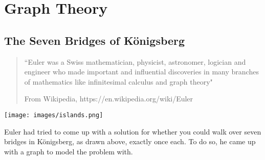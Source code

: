 \documentclass[a4paper,12pt]{book}
\title{}
\author{Rachel Morris}
\date{\today}
\begin{document}
    \togglefalse{answerkey}
    
    \section{Graph Theory}

    \subsection{The Seven Bridges of K{\"o}nigsberg}

    \begin{quote}
    ``Euler was a Swiss mathematician, physicist, astronomer, logician and engineer who made important and influential discoveries in many branches of mathematics like infinitesimal calculus and graph theory"

    \footnotesize From Wikipedia, https://en.wikipedia.org/wiki/Euler
    \end{quote}

    \begin{center}
        \texttt{[image: images/islands.png]}
    \end{center}

    Euler had tried to come up with a solution for whether you could walk over seven bridges in K{\"o}nigsberg, as drawn above,
    exactly once each. To do so, he came up with a graph to model the problem with.

    \begin{center}
    \end{center}

    
    
    
\end{document}
